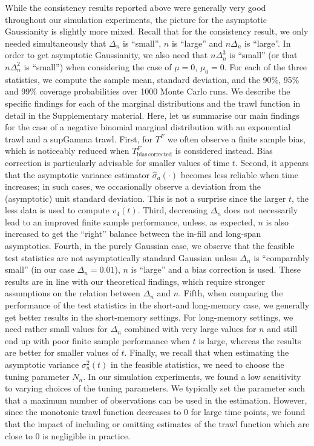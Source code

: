\documentclass{article}
\theoremstyle{plain}
\theoremstyle{definition}
\theoremstyle{remark}
\begin{document}
While the consistency results reported above were generally very good throughout our simulation experiments, the picture for the asymptotic Gaussianity is slightly more mixed. 
Recall that for the consistency result, we only needed simultaneously that $\Delta_n$ is ``small'', $n$ is ``large'' and  $n \Delta_n$ is ``large''. 
In order to get asymptotic Gaussianity, we also need that $n \Delta_n^3$ is ``small'' (or  that $n \Delta_n^2$ is ``small'') when considering the case of $\mu=0$, $\mu_0=0$. 	 
For each of the three statistics, we compute the sample mean, standard deviation, and the 
90\%, 95\% and 99\% coverage probabilities over 1000 Monte Carlo runs. 
We describe the specific findings for each of the marginal distributions and the trawl function in detail in the Supplementary material. 
Here, let us summarise our main findings
for the case of a negative binomial marginal distribution with an exponential trawl and a supGamma trawl.
First, for $T^F$ we often observe a  finite sample bias, which is noticeably reduced when $T^{F}_{\mathrm{bias \, corrected}}$ is considered instead. Bias correction is particularly advisable for smaller values of time $t$. 
Second, it appears that the asymptotic variance estimator $\hat \sigma_a(\cdot)$ becomes less reliable when time increases; in such cases, we occasionally observe a deviation from the (asymptotic) unit standard deviation. This is not a surprise since the larger $t$, the less data is used to compute $\hat{v}_{4}(t)$.
Third, decreasing $\Delta_n$ does not necessarily lead to an improved finite sample performance, unless, as expected, $n$ is also increased to get the ``right'' balance between the in-fill and long-span asymptotics.
Fourth, in the purely Gaussian case, we observe that the feasible test statistics are not asymptotically standard Gaussian unless $\Delta_n$ is ``comparably small'' (in our case $\Delta_n=0.01$), $n$ is ``large'' and a bias correction is used.  These results are in line with our theoretical findings, which require stronger assumptions on the relation between $\Delta_n$ and $n$. 
Fifth, when comparing the performance of the test statistics in the short-and long-memory case, we generally get better results in the short-memory settings. For long-memory settings, we need rather small values for $\Delta_n$ combined with very large values for $n$ and still end up with poor finite sample performance when $t$ is large, whereas the results are better for smaller values of $t$. 
Finally, we recall that when estimating the asymptotic variance $\sigma_a^2(t)$ in the feasible statistics, we need to choose the tuning parameter $N_n$.  In our simulation experiments,  we found a low sensitivity to varying choices of the tuning parameters. We typically set the parameter such that a maximum number of observations can be used in the estimation. However, since the monotonic trawl function decreases to 0 for large time points, we found that the impact of including or omitting estimates of the trawl function which are close to 0 is negligible in practice. 
\end{document}

